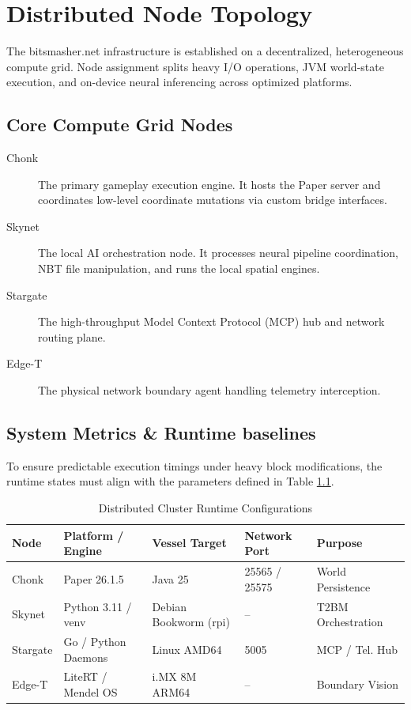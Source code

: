 \chapter{Distributed Node Topology}

The bitsmasher.net infrastructure is established on a decentralized, heterogeneous compute grid. Node assignment splits heavy I/O operations, JVM world-state execution, and on-device neural inferencing across optimized platforms.

\section{Core Compute Grid Nodes}

\begin{description}
    \item[Chonk] The primary gameplay execution engine. It hosts the Paper server and coordinates low-level coordinate mutations via custom bridge interfaces.
    \item[Skynet] The local AI orchestration node. It processes neural pipeline coordination, NBT file manipulation, and runs the local spatial engines.
    \item[Stargate] The high-throughput Model Context Protocol (MCP) hub and network routing plane.
    \item[Edge-T] The physical network boundary agent handling telemetry interception.
\end{description}

\section{System Metrics \& Runtime baselines}
To ensure predictable execution timings under heavy block modifications, the runtime
states must align with the parameters defined in Table \ref{tab:runtime-topology}.

\begin{table}[htbp]
\centering
\caption{Distributed Cluster Runtime Configurations}
\label{tab:runtime-topology}
\begin{tabular}{lllll}
\toprule
\textbf{Node} & \textbf{Platform / Engine} & \textbf{Vessel Target} & \textbf{Network Port} & \textbf{Purpose} \\ 
\midrule
Chonk    & Paper 26.1.5            & Java 25                & 25565 / 25575         & World Persistence \\
Skynet   & Python 3.11 / venv      & Debian Bookworm (rpi)  & --                    & T2BM Orchestration \\
Stargate & Go / Python Daemons     & Linux AMD64            & 5005                  & MCP / Tel. Hub \\
Edge-T   & LiteRT / Mendel OS      & i.MX 8M ARM64          & --                    & Boundary Vision \\
\bottomrule
\end{tabular}
\end{table}